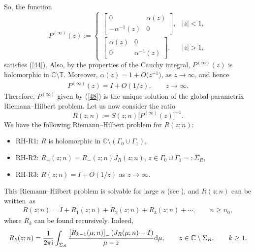 \documentclass[10pt,a4paper]{amsart}
\numberwithin{equation}{section}
\newcommand{\C}{{\mathbb C}}
\newcommand{\T}{{\mathbb T}}
\newcommand{\al}{\alpha}
\newcommand{\Ga}{\Gamma}
\newcommand{\ii}{{\rm i}}
\newcommand{\dd}{{\rm d}}
\begin{document}
		So, the function \begin{equation}\label{48}
			P^{(\infty)}(z) :=\begin{cases}
				\begin{bmatrix}
					0 & \al(z) \\
					-\al^{-1}(z) & 0
				\end{bmatrix}, & |z|<1, \\[14pt]
				\begin{bmatrix}
					\al(z) & 0 \\
					0 & \al^{-1}(z)
				\end{bmatrix}, & |z|>1,
			\end{cases}
		\end{equation}
		satisfies (\ref{44}). Also, by the properties of the Cauchy integral, $P^{(\infty)}(z)$ is holomorphic in $\C \setminus \T$. Moreover, $\al(z)=1+O\big(z^{-1}\big)$, as $z\to \infty$, and hence \begin{gather*}%
			P^{(\infty)}(z)=I+O(1/z), \qquad z \to \infty.
		\end{gather*}
		Therefore, $P^{(\infty)}$ given by (\ref{48}) is the unique solution of the global parametrix Riemann--Hilbert problem. Let us now consider the ratio
		\begin{equation*}
			R(z;n):= S(z;n) \big[ P^{(\infty)}(z) \big]^{-1}.
		\end{equation*}
		We have the following Riemann--Hilbert problem for $R(z;n)$:
		\begin{itemize}\itemsep=0pt
			\item {\rm RH-R1:} $ R$ is holomorphic in $\C\setminus (\Ga_0 \cup \Ga_1)$,
			\item {\rm RH-R2:} $R_{+}(z;n)=R_{-}(z;n) J_{R}(z;n)$, $ z \in \Ga_0 \cup \Ga_1 =: \Sigma_R$,
			\item {\rm RH-R3:} $ R(z;n)=I+O(1/z) $ as $z \to \infty$.
		\end{itemize}
		This Riemann--Hilbert problem is solvable for large $n$ (see \cite{Deiftetal2, Deiftetal}), and $R(z;n)$ can be written~as
		\begin{gather*}%
			R(z;n) = I + R_1(z;n) + R_2(z;n) + R_3(z;n) + \cdots, \qquad n \geq n_0,
		\end{gather*}
		where $R_k$ can be found recursively. Indeed,
		\begin{gather*}%
			R_k(z;n) = \frac{1}{2\pi \ii}\int_{\Sigma_R} \frac{\left[ R_{k-1}(\mu;n)\right]_- \left( J_R(\mu;n)-I\right) }{\mu-z}\dd \mu, \qquad z \in \C \setminus \Sigma_R, \qquad k\geq1.
		\end{gather*}	
\end{document}
